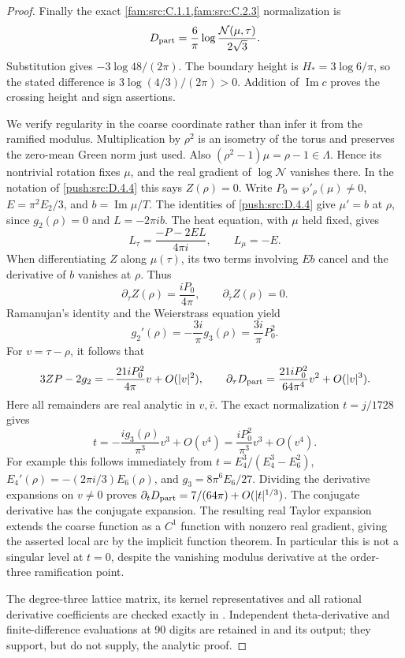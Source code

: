\begin{proof}
Finally the exact \cref{fam:src:C.1.1,fam:src:C.2.3} normalization is
\[
 D_{\rm part}=\frac6\pi
          \log\frac{\mathcal N(\mu,\tau)}{2\sqrt3}.
\]
Substitution gives \(-3\log48/(2\pi)\). The boundary height is
\(H_*=3\log6/\pi\), so the stated difference is
\(3\log(4/3)/(2\pi)>0\). Addition of \(\operatorname{Im}c\)
proves the crossing height and sign assertions.

We verify regularity in the coarse coordinate rather than infer it
from the ramified modulus. Multiplication by \(\rho^2\) is an
isometry of the torus and preserves the zero-mean Green norm just
used. Also \((\rho^2-1)\mu=\rho-1\in\Lambda\). Hence its
nontrivial rotation fixes \(\mu\), and the real gradient of
\(\log\mathcal N\) vanishes there. In the notation of \ref{push:src:D.4.4} this
says \(Z(\rho)=0\). Write \(P_0=\wp'_\rho(\mu)\ne0\),
\(E=\pi^2E_2/3\), and \(b=\operatorname{Im}\mu/T\).
The identities of \ref{push:src:D.4.4} give \(\mu'=b\) at \(\rho\), since
\(g_2(\rho)=0\) and \(L=-2\pi ib\). The heat equation, with
\(\mu\) held fixed, gives
\[
 L_\tau=\frac{-P-2EL}{4\pi i},\qquad L_\mu=-E.
\]
When differentiating \(Z\) along \(\mu(\tau)\), its two terms
involving \(E b\) cancel and the derivative of \(b\) vanishes at
\(\rho\). Thus
\[
 \partial_\tau Z(\rho)=\frac{iP_0}{4\pi},\qquad
 \partial_{\bar\tau}Z(\rho)=0.
\]
Ramanujan's identity and the Weierstrass equation yield
\[
 g_2'(\rho)=-\frac{3i}{\pi}g_3(\rho)
            =\frac{3i}{\pi}P_0^2.
\]
For \(v=\tau-\rho\), it follows that
\[
 3ZP-2g_2=-\frac{21iP_0^2}{4\pi}v+O(|v|^2),\qquad
 \partial_\tau D_{\rm part}
       =\frac{21iP_0^2}{64\pi^4}v^2+O(|v|^3).
\]
Here all remainders are real analytic in \(v,\bar v\).
The exact normalization \(t=j/1728\) gives
\[
 t=-\frac{i g_3(\rho)}{\pi^3}v^3+O(v^4)
   =\frac{iP_0^2}{\pi^3}v^3+O(v^4).
\]
For example this follows immediately from
\(t=E_4^3/(E_4^3-E_6^2)\),
\(E_4'(\rho)=-(2\pi i/3)E_6(\rho)\), and
\(g_3=8\pi^6E_6/27\). Dividing the derivative expansions on
\(v\ne0\) proves
\(\partial_tD_{\rm part}=7/(64\pi)+O(|t|^{1/3})\).
The conjugate derivative has the conjugate expansion. The resulting
real Taylor expansion extends the coarse function as a \(C^1\)
function with nonzero real gradient, giving the asserted local arc
by the implicit function theorem. In particular this is not a
singular level at \(t=0\), despite the vanishing modulus derivative
at the order-three ramification point.

The degree-three lattice matrix, its kernel representatives and all
rational derivative coefficients are checked exactly in
. Independent theta-derivative
and finite-difference evaluations at 90 digits are retained in
 and its output;
they support, but do not supply, the analytic proof.
\end{proof}


